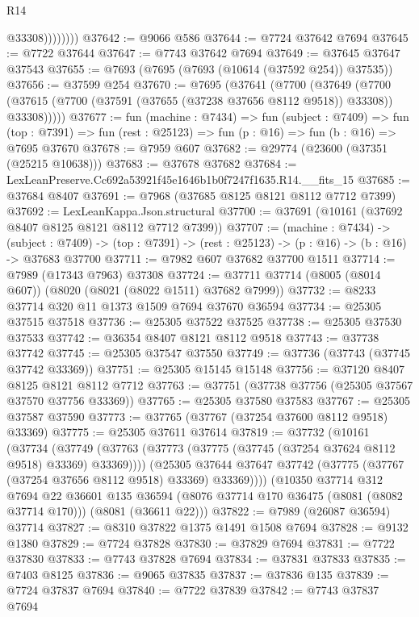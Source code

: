 \begin{lexlean}{R14}
\begin{coremodule}
                    @33308))))))))
@37642 := @9066 @586
@37644 := @7724 @37642 @7694
@37645 := @7722 @37644
@37647 := @7743 @37642 @7694
@37649 := @37645 @37647 @37543
@37655 := @7693 (@7695 (@7693 (@10614 (@37592 @254)) @37535))
@37656 := @37599 @254
@37670 := @7695
    (@37641
      (@7700
        (@37649
          (@7700 (@37615 (@7700 (@37591 (@37655 (@37238 @37656 @8112 @9518)) @33308)) @33308)))))
@37677 := fun (machine : @7434) =>
  fun (subject : @7409) =>
  fun (top : @7391) => fun (rest : @25123) => fun (p : @16) => fun (b : @16) => @7695 @37670
@37678 := @7959 @607
@37682 := @29774 (@23600 (@37351 (@25215 @10638)))
@37683 := @37678 @37682
@37684 := LexLeanPreserve.Cc692a53921f45e1646b1b0f7247f1635.R14.__fits_15
@37685 := @37684 @8407
@37691 := @7968 (@37685 @8125 @8121 @8112 @7712 @7399)
@37692 := LexLeanKappa.Json.structural
@37700 := @37691 (@10161 (@37692 @8407 @8125 @8121 @8112 @7712 @7399))
@37707 := (machine : @7434) ->
  (subject : @7409) -> (top : @7391) -> (rest : @25123) -> (p : @16) -> (b : @16) -> @37683 @37700
@37711 := @7982 @607 @37682 @37700 @1511
@37714 := @7989 (@17343 @7963) @37308
@37724 := @37711 @37714 (@8005 (@8014 @607)) (@8020 (@8021 (@8022 @1511) @37682 @7999))
@37732 := @8233 @37714 @320 @11 @1373 @1509 @7694 @37670 @36594
@37734 := @25305 @37515 @37518
@37736 := @25305 @37522 @37525
@37738 := @25305 @37530 @37533
@37742 := @36354 @8407 @8121 @8112 @9518
@37743 := @37738 @37742
@37745 := @25305 @37547 @37550
@37749 := @37736 (@37743 (@37745 @37742 @33369))
@37751 := @25305 @15145 @15148
@37756 := @37120 @8407 @8125 @8121 @8112 @7712
@37763 := @37751 (@37738 @37756 (@25305 @37567 @37570 @37756 @33369))
@37765 := @25305 @37580 @37583
@37767 := @25305 @37587 @37590
@37773 := @37765 (@37767 (@37254 @37600 @8112 @9518) @33369)
@37775 := @25305 @37611 @37614
@37819 := @37732
    (@10161
      (@37734
        (@37749 (@37763 (@37773 (@37775 (@37745 (@37254 @37624 @8112 @9518) @33369) @33369))))
        (@25305 @37644 @37647 @37742 (@37775 (@37767 (@37254 @37656 @8112 @9518) @33369) @33369))))
    (@10350
      @37714
      @312
      @7694
      @22
      @36601
      @135
      @36594
      (@8076 @37714 @170 @36475 (@8081 (@8082 @37714 @170)))
      (@8081 (@36611 @22)))
@37822 := @7989 (@26087 @36594) @37714
@37827 := @8310 @37822 @1375 @1491 @1508 @7694
@37828 := @9132 @1380
@37829 := @7724 @37828
@37830 := @37829 @7694
@37831 := @7722 @37830
@37833 := @7743 @37828 @7694
@37834 := @37831 @37833
@37835 := @7403 @8125
@37836 := @9065 @37835
@37837 := @37836 @135
@37839 := @7724 @37837 @7694
@37840 := @7722 @37839
@37842 := @7743 @37837 @7694

\end{coremodule}
\end{lexlean}
